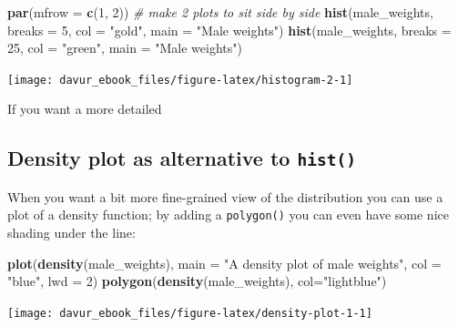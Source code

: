 \documentclass[]{book}
\newenvironment{Shaded}{\begin{snugshade}}{\end{snugshade}}
\newcommand{\CommentTok}[1]{\textcolor[rgb]{0.56,0.35,0.01}{\textit{#1}}}
\newcommand{\DataTypeTok}[1]{\textcolor[rgb]{0.13,0.29,0.53}{#1}}
\newcommand{\DecValTok}[1]{\textcolor[rgb]{0.00,0.00,0.81}{#1}}
\newcommand{\KeywordTok}[1]{\textcolor[rgb]{0.13,0.29,0.53}{\textbf{#1}}}
\newcommand{\NormalTok}[1]{#1}
\newcommand{\StringTok}[1]{\textcolor[rgb]{0.31,0.60,0.02}{#1}}
\begin{document}
\begin{Shaded}
\begin{Highlighting}[]
\KeywordTok{par}\NormalTok{(}\DataTypeTok{mfrow =} \KeywordTok{c}\NormalTok{(}\DecValTok{1}\NormalTok{, }\DecValTok{2}\NormalTok{)) }\CommentTok{# make 2 plots to sit side by side}
\KeywordTok{hist}\NormalTok{(male_weights, }\DataTypeTok{breaks =} \DecValTok{5}\NormalTok{, }\DataTypeTok{col =} \StringTok{"gold"}\NormalTok{, }\DataTypeTok{main =} \StringTok{"Male weights"}\NormalTok{)}
\KeywordTok{hist}\NormalTok{(male_weights, }\DataTypeTok{breaks =} \DecValTok{25}\NormalTok{, }\DataTypeTok{col =} \StringTok{"green"}\NormalTok{, }\DataTypeTok{main =} \StringTok{"Male weights"}\NormalTok{)}
\end{Highlighting}
\end{Shaded}

\begin{center}\texttt{[image: davur\_ebook\_files/figure-latex/histogram-2-1]} \end{center}

If you want a more detailed

\hypertarget{density-plot-as-alternative-to-hist}{%
\subsection{\texorpdfstring{Density plot as alternative to \texttt{hist()}}{Density plot as alternative to hist()}}\label{density-plot-as-alternative-to-hist}}

When you want a bit more fine-grained view of the distribution you can use a plot of a density function; by adding a \texttt{polygon()} you can even have some nice shading under the line:

\begin{Shaded}
\begin{Highlighting}[]
\KeywordTok{plot}\NormalTok{(}\KeywordTok{density}\NormalTok{(male_weights),}
     \DataTypeTok{main =} \StringTok{"A density plot of male weights"}\NormalTok{,}
     \DataTypeTok{col =} \StringTok{"blue"}\NormalTok{, }\DataTypeTok{lwd =} \DecValTok{2}\NormalTok{)}
\KeywordTok{polygon}\NormalTok{(}\KeywordTok{density}\NormalTok{(male_weights), }\DataTypeTok{col=}\StringTok{"lightblue"}\NormalTok{)}
\end{Highlighting}
\end{Shaded}

\begin{center}\texttt{[image: davur\_ebook\_files/figure-latex/density-plot-1-1]} \end{center}
\end{document}
